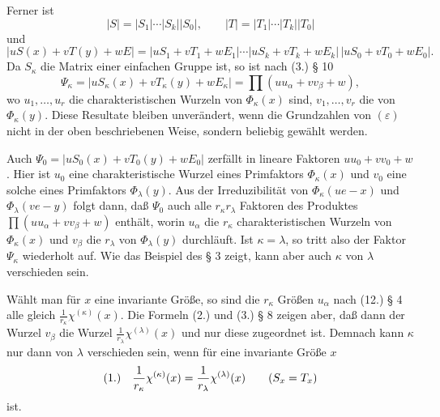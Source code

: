 \documentclass[11pt]{article}
\newcommand{\eps}{\varepsilon}
\newcommand{\fnum}[1]{\textup{(\ensuremath{#1}.)}\quad}
\begin{document}
Ferner ist
\[
 |S|=|S_1|\cdots|S_k||S_0|,
 \qquad
 |T|=|T_1|\cdots|T_k||T_0|
\]
und
\[
 |uS(x)+vT(y)+wE|=|uS_1+vT_1+wE_1|\cdots|uS_k+vT_k+wE_k|\,|uS_0+vT_0+wE_0|.
\]
Da $S_\kappa$ die Matrix einer einfachen Gruppe ist, so ist nach (3.) § 10
\[
 \Psi_\kappa=|uS_\kappa(x)+vT_\kappa(y)+wE_\kappa|
 =\prod(uu_\alpha+vv_\beta+w),
\]
wo $u_1,\ldots,u_r$ die charakteristischen Wurzeln von $\Phi_\kappa(x)$ sind, $v_1,\ldots,v_r$ die von $\Phi_\kappa(y)$. Diese Resultate bleiben unverändert, wenn die Grundzahlen von $(\eps)$ nicht in der oben beschriebenen Weise, sondern beliebig gewählt werden.

Auch $\Psi_0=|uS_0(x)+vT_0(y)+wE_0|$ zerfällt in lineare Faktoren $uu_0+vv_0+w$. Hier ist $u_0$ eine charakteristische Wurzel eines Primfaktors $\Phi_\kappa(x)$ und $v_0$ eine solche eines Primfaktors $\Phi_\lambda(y)$. Aus der Irreduzibilität von $\Phi_\kappa(ue-x)$ und $\Phi_\lambda(ve-y)$ folgt dann, daß $\Psi_0$ auch alle $r_\kappa r_\lambda$ Faktoren des Produktes $\prod(uu_\alpha+vv_\beta+w)$ enthält, worin $u_\alpha$ die $r_\kappa$ charakteristischen Wurzeln von $\Phi_\kappa(x)$ und $v_\beta$ die $r_\lambda$ von $\Phi_\lambda(y)$ durchläuft. Ist $\kappa=\lambda$, so tritt also der Faktor $\Psi_\kappa$ wiederholt auf. Wie das Beispiel des § 3 zeigt, kann aber auch $\kappa$ von $\lambda$ verschieden sein.

Wählt man für $x$ eine invariante Größe, so sind die $r_\kappa$ Größen $u_\alpha$ nach (12.) § 4 alle gleich $\frac1{r_\kappa}\chi^{(\kappa)}(x)$. Die Formeln (2.) und (3.) § 8 zeigen aber, daß dann der Wurzel $v_\beta$ die Wurzel $\frac1{r_\lambda}\chi^{(\lambda)}(x)$ und nur diese zugeordnet ist. Demnach kann $\kappa$ nur dann von $\lambda$ verschieden sein, wenn für eine invariante Größe $x$
\[
\fnum{1} \frac1{r_\kappa}\chi^{(\kappa)}(x)=\frac1{r_\lambda}\chi^{(\lambda)}(x)\qquad(S_x=T_x)
\]
ist.
\end{document}
